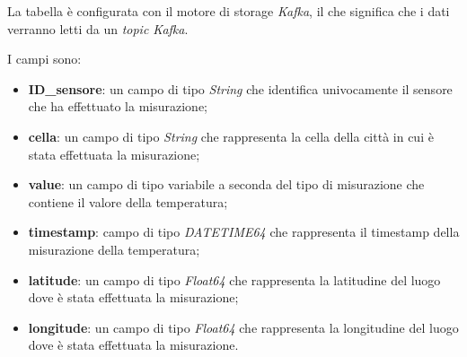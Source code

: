     La tabella è configurata con il motore di storage \textit{Kafka}, il che significa che i dati verranno letti da un \textit{topic Kafka}. 

    I campi sono:
    \begin{itemize}
        \item \textbf{ID\_sensore}: un campo di tipo \textit{String} che identifica univocamente il sensore che ha effettuato la misurazione;
        \item \textbf{cella}: un campo di tipo \textit{String} che rappresenta la cella della città in cui è stata effettuata la misurazione;
        \item \textbf{value}: un campo di tipo variabile a seconda del tipo di misurazione che contiene il valore della temperatura;
        \item \textbf{timestamp}: campo di tipo \textit{DATETIME64} che rappresenta il timestamp della misurazione della temperatura;
        \item \textbf{latitude}: un campo di tipo \textit{Float64} che rappresenta la latitudine del luogo dove è stata effettuata la misurazione;
        \item \textbf{longitude}: un campo di tipo \textit{Float64} che rappresenta la longitudine del luogo dove è stata effettuata la misurazione.
    \end{itemize}

